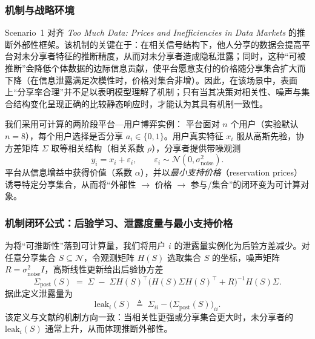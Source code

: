 \subsubsection{机制与战略环境}
\label{subsubsec:B_game}

Scenario~1 对齐 \emph{Too Much Data: Prices and Inefficiencies in Data Markets} 的推断外部性框架。该机制的关键在于：在相关信号结构下，他人分享的数据会提高平台对未分享者特征的推断精度，从而对未分享者造成隐私泄露；同时，这种“可被推断”会降低个体数据的边际信息贡献，使平台愿意支付的价格随分享集合扩大而下降（在信息泄露满足次模性时，价格对集合非增）。因此，在该场景中，表面上“分享率合理”并不足以表明模型理解了机制；只有当其决策对相关性、噪声与集合结构变化呈现正确的比较静态响应时，才能认为其具有机制一致性。

我们采用可计算的两阶段平台—用户博弈实例：
平台面对 $n$ 个用户（实验默认 $n=8$），每个用户选择是否分享 $a_i\in\{0,1\}$。用户真实特征 $x_i$ 服从高斯先验，协方差矩阵 $\Sigma$ 取等相关结构（相关系数 $\rho$），分享者提供带噪观测
\begin{equation}
y_i = x_i + \varepsilon_i,\qquad \varepsilon_i\sim\mathcal{N}(0,\sigma^2_{\text{noise}}).
\label{eq:B_observation}
\end{equation}
平台从信息增益中获得价值（系数 $\alpha$），并以\emph{最小支持价格}（reservation prices）诱导特定分享集合，从而将“外部性 $\rightarrow$ 价格 $\rightarrow$ 参与/集合”的闭环变为可计算对象。

\subsubsection{机制闭环公式：后验学习、泄露度量与最小支持价格}
\label{subsubsec:B_formula}

为将“可推断性”落到可计算量，我们将用户 $i$ 的泄露量实例化为后验方差减少。对任意分享集合 $S\subseteq\mathcal{N}$，令观测矩阵 $H(S)$ 选取集合 $S$ 的坐标，噪声矩阵 $R=\sigma^2_{\text{noise}}I$，高斯线性更新给出后验协方差
\begin{equation}
\Sigma_{\text{post}}(S) \;=\; \Sigma \;-\; \Sigma H(S)^\top \big(H(S)\Sigma H(S)^\top + R\big)^{-1} H(S)\Sigma .
\label{eq:B_posterior}
\end{equation}
据此定义泄露量为
\begin{equation}
\mathrm{leak}_i(S)\;\triangleq\; \Sigma_{ii} - \big(\Sigma_{\text{post}}(S)\big)_{ii}.
\label{eq:B_leak}
\end{equation}
该定义与文献的机制方向一致：当相关性更强或分享集合更大时，未分享者的 $\mathrm{leak}_i(S)$ 通常上升，从而体现推断外部性。

